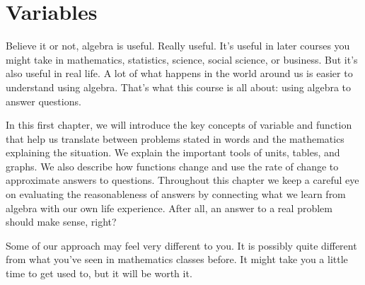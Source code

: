 \chapter{Variables}

Believe it or not, algebra is useful.  Really useful. It's useful in later courses you might take in mathematics, statistics, science, social science, or business.  But it's also useful in real life.  A lot of what happens in the world around us is easier to understand using algebra.  That's what this course is all about:  using algebra to answer questions. 

In this first chapter, we will introduce the key concepts of variable and function that help us translate between problems stated in words and the mathematics explaining the situation.  We explain the important tools of units, tables, and graphs.  We also describe how functions change and use the rate of change to approximate answers to questions.  Throughout this chapter we keep a careful eye on evaluating the reasonableness of answers by connecting what we learn from algebra with our own life experience. After all, an answer to a real problem should make sense, right?

Some of our approach may feel very different to you.  It is possibly quite different from what you've seen in mathematics classes before.   It might take you a little time to get used to, but it will be worth it.

